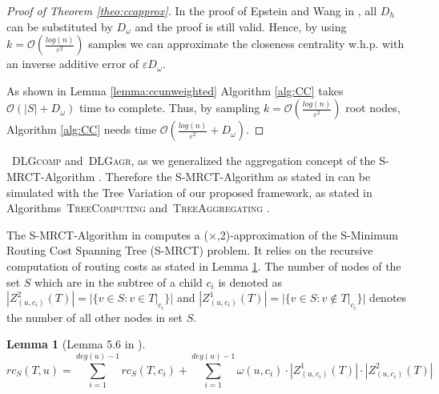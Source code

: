 \documentclass[11pt]{article}
\newcommand{\BO}{\mathcal{O}}
\newtheorem{lemma}[theorem]{Lemma}
\newcommand{\todoI}[1]{}\newcommand{\blueI}[1]{}
\renewcommand{\epsilon}{\varepsilon}
\newif\iffull
\begin{document}
\begin{proof}[Proof of Theorem \ref{theo:ccapprox}]
In the proof of Epstein and Wang in \cite{eppstein:2001:fastCCapprox}, all $D_h$ can be substituted by $D_\omega$ and the proof is still valid. Hence, by using $k=\BO\left(\frac{log(n)}{\epsilon^2}\right)$ samples we can approximate the closeness centrality w.h.p. with an inverse additive error of $\epsilon D_\omega$.

As shown in Lemma \ref{lemma:ccunweighted} Algorithm \ref{alg:CC} takes $\BO(|S|+D_\omega)$ time to complete. Thus, by sampling $k=\BO\left(\frac{log(n)}{\epsilon^2}\right)$ root nodes, Algorithm \ref{alg:CC} needs  time $\BO\left(\frac{log(n)}{\epsilon^2}+D_\omega\right)$.
\end{proof} 
\fi

\iffull
\subsection{Minimum Routing Cost Tree}
\label{app:MRCT}

The S-MRCT-Algorithm in \cite{hochuli:holzer:MRCST} is executed in a similar fashion as our proposed Algorithms\iffull~\ref{alg:DLGcomp}\fi~\textsc{DLGcomp} and\iffull~\ref{alg:DLGagr}\fi~\textsc{DLGagr}, as we generalized the aggregation concept of the S-MRCT-Algorithm \cite{hochuli:holzer:MRCST}.
Therefore the S-MRCT-Algorithm as stated in \cite{hochuli:holzer:MRCST} can be simulated with the Tree Variation of our proposed framework, as stated in Algorithms\iffull~\ref{alg:TreeComputing}\fi~\textsc{TreeComputing} and\iffull~\ref{alg:TreeAggregating}\fi~\textsc{TreeAggregating} .


The S-MRCT-Algorithm in \cite{hochuli:holzer:MRCST} computes a ($\times$,2)-approximation of the S-Minimum Routing Cost Spanning Tree (S-MRCT) problem. It relies on the recursive computation of  routing costs as stated in Lemma \ref{lemma:recRC}. The number of nodes of the set $S$ which are in the subtree of a child $c_i$ is denoted as $|Z_{\left(u,c_i\right)}^2\left(T\right)|=|\{v\in S:v\in T|_{c_i}\}|$ and $|Z_{\left(u,c_i\right)}^1\left(T\right)|=|\{v\in S:v\notin T|_{c_i}\}|$ \todoI{update} denotes the number of all other nodes in set $S$.

\begin{lemma}[Lemma 5.6 in \cite{hochuli:holzer:MRCST}]\label{lemma:recRC}
\[rc_S\left(T,u\right)  = \sum_{i=1}^{deg\left(u\right)-1} rc_S\left(T,c_i\right) + \sum_{i=1}^{deg\left(u\right)-1} \omega\left(u,c_i\right)\cdot |Z_{\left(u,c_i\right)}^1\left(T\right)|\cdot|Z_{\left(u,c_i\right)}^2\left(T\right)|\]
\end{lemma}
\end{document}
